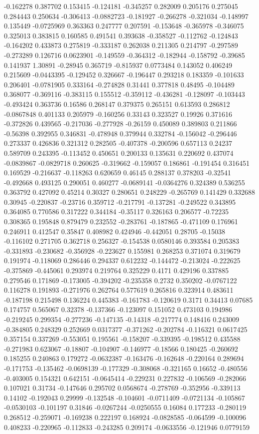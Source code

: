 -0.162278 0.387702 0.153415 -0.124181 -0.345257 0.282009 0.205176 0.275045 0.284443 0.250634 -0.306413 -0.0882723 -0.181927 -0.266278 -0.321034 -0.148997 0.135449 -0.0725969 0.363363 0.247777 0.207591 -0.153648 -0.365978 -0.346075 0.325013 0.383815 0.160585 0.491541 0.393638 -0.358527 -0.112762 -0.124843 -0.164202 0.433873 0.275819 -0.333187 0.262038 0.211305 0.214797 -0.297589 -0.273289 0.126716 0.0623901 -0.149559 -0.364312 -0.182944 -0.158792 -0.39685 0.141937 1.30891 -0.28945 0.365719 -0.815937 0.0773484 0.143052 0.406249 0.215609 -0.0443395 -0.129452 0.326667 -0.196447 0.293218 0.183359 -0.101633 0.206401 -0.0781905 0.333164 -0.274828 0.31441 0.377818 0.48495 -0.104489 0.368077 -0.369116 -0.383115 0.155512 -0.359112 -0.436281 -0.128097 -0.103443 -0.493424 0.363736 0.16586 0.268147 0.379375 0.265151 0.613593 0.286812 -0.0867848 0.401133 0.205979 -0.160256 0.33143 0.323527 0.19926 0.371616 -0.372826 0.439565 -0.217036 -0.277928 -0.26159 0.450089 0.389803 0.211866 -0.56398 0.392955 0.346831 -0.478948 0.379944 0.332784 -0.156042 -0.296446 0.273337 0.426836 0.321312 0.282505 -0.407378 -0.200596 0.657113 0.24237 0.589709 0.243395 -0.113452 0.450651 0.200133 0.135631 0.220692 0.437074 -0.0839867 -0.0829718 0.260625 -0.319662 -0.159057 0.186861 -0.191454 0.316451 0.169529 -0.216637 -0.118263 0.620659 0.46145 0.288137 0.378203 -0.32541 -0.492668 0.493125 0.290051 0.460277 -0.0689141 -0.0364276 0.324389 0.536255 0.363792 0.427092 0.45214 0.30327 0.280651 0.248229 -0.265769 0.141429 0.332688 0.30945 -0.220837 -0.23716 0.359712 -0.217791 -0.137281 -0.249522 0.343895 0.364085 0.770586 0.317222 0.344184 -0.35117 0.326163 0.206577 -0.72235 0.308365 0.195848 0.879479 0.232552 -0.283761 -0.187865 -0.471109 0.176961 0.246911 0.412547 0.35847 0.408982 0.424946 -0.442051 0.28705 -0.15038 -0.116102 0.271705 0.362718 0.256327 -0.154538 0.0580146 0.393584 0.205383 -0.331893 -0.230682 -0.356928 -0.223627 0.155981 0.268253 0.371074 0.319679 0.191974 -0.118069 0.286446 0.294337 0.612232 -0.144472 -0.213024 -0.222625 -0.375869 -0.445061 0.293974 0.219764 0.325229 0.4171 0.429196 0.337885 0.279546 0.171869 -0.173005 -0.394202 -0.235358 0.2732 0.350202 -0.0767122 0.116278 0.191893 -0.271976 0.262764 0.577619 0.265816 0.323914 0.483611 -0.187198 0.215498 0.136224 0.445383 -0.161783 -0.120619 0.3171 0.34413 0.07685 0.174757 0.565067 0.32378 -0.137366 -0.123097 0.151052 0.473103 0.194986 -0.219245 0.299354 -0.277236 -0.147135 -0.14318 -0.217774 0.148416 0.243009 -0.384805 0.248329 0.252669 0.0317377 -0.371262 -0.202784 -0.116321 0.0617425 0.357154 0.337269 -0.553051 0.195561 -0.158207 -0.339395 -0.198512 0.435588 -0.271983 0.623067 -0.18807 -0.104907 -0.146977 -0.18566 0.180425 -0.260692 0.185255 0.240863 0.179272 -0.0632387 -0.163476 -0.162648 -0.220164 0.289694 -0.171753 -0.135462 -0.0698139 -0.177329 -0.308068 -0.321165 0.16652 -0.480556 -0.403005 0.154321 0.642151 -0.0645414 -0.229231 0.227832 -0.106569 -0.282066 0.107021 0.31734 -0.147646 0.295702 0.0568674 -0.278769 -0.352956 -0.339113 0.14102 -0.192043 0.29999 -0.132548 -0.104601 -0.0711409 -0.0721134 -0.105867 -0.0530103 -0.101197 0.31846 -0.0267244 -0.0250555 0.16084 0.177233 -0.280119 0.268512 -0.259071 -0.169238 0.222197 0.168924 -0.0828585 -0.064599 -0.100096 0.408233 -0.220965 -0.112833 -0.243285 0.209174 -0.0633556 -0.121946 0.0779159 